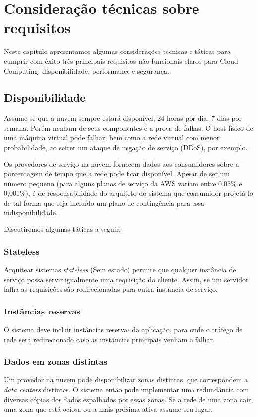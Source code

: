 \chapter{Consideração técnicas sobre requisitos}
	Neste capítulo apresentamos algumas considerações técnicas e táticas para cumprir com êxito três principais requisitos não funcionais claros para Cloud Computing: disponibilidade, performance e segurança.

\section{Disponibilidade}

	Assume-se que a nuvem sempre estará disponível, 24 horas por dia, 7 dias por semana. Porém nenhum de seus componentes é a prova de falhas. O host físico de uma máquina virtual pode falhar, bem como a rede virtual com menor probabilidade, ao sofrer um ataque de negação de serviço (DDoS), por exemplo.

	Os provedores de serviço na nuvem fornecem dados aos consumidores sobre a porcentagem de tempo que a rede pode ficar disponível. Apesar de ser um número pequeno (para alguns planos de serviço da AWS variam entre 0,05\% e 0,001\%), é de responsabilidade do arquiteto do sistema que consumidor projetá-lo de tal forma que seja incluído um plano de contingência para essa indisponibilidade.

	Discutiremos algumas táticas a seguir:

	\subsection{Stateless}
	Arquitear sistemas \textit{stateless} (Sem estado) permite que qualquer instância de serviço possa servir igualmente uma requisição do cliente. Assim, se um servidor falha as requisições são redirecionadas para outra instância de serviço.

	\subsection{Instâncias reservas}
	O sistema deve incluir instâncias reservas da aplicação, para onde o tráfego de rede será redirecionado caso as instâncias principais venham a falhar.

	\subsection{Dados em zonas distintas}
	Um provedor na nuvem pode disponibilizar zonas distintas, que correspondem a \textit{data centers} distintos. O sistema então pode implementar uma redundância com diversas cópias dos dados espalhados por essas zonas. Se a rede de uma zona cair, uma zona que está ociosa ou a mais próxima ativa assume seu lugar.
	
